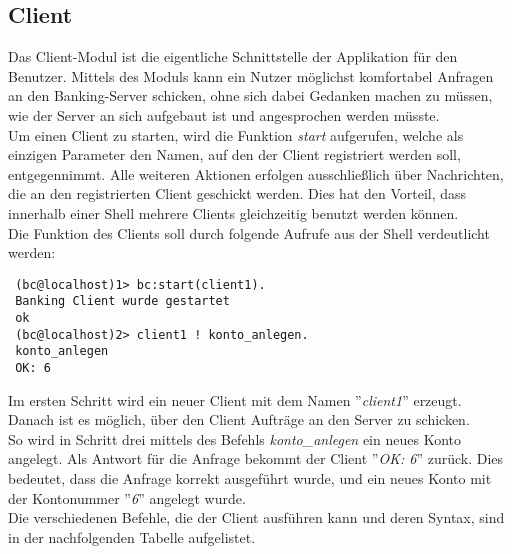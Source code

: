 \subsection{Client}
Das Client-Modul ist die eigentliche Schnittstelle der Applikation für den Benutzer. Mittels des Moduls kann ein Nutzer möglichst komfortabel Anfragen an den Banking-Server schicken, ohne sich dabei Gedanken machen zu müssen, wie der Server an sich aufgebaut ist und angesprochen werden müsste.\\
Um einen Client zu starten, wird die Funktion \textit{start} aufgerufen, welche als einzigen Parameter den Namen, auf den der Client registriert werden soll, entgegennimmt. Alle weiteren Aktionen erfolgen ausschließlich über Nachrichten, die an den registrierten Client geschickt werden. Dies hat den Vorteil, dass innerhalb einer Shell mehrere Clients gleichzeitig benutzt werden können.\\
Die Funktion des Clients soll durch folgende Aufrufe aus der Shell verdeutlicht werden:
\begin{lstlisting} 
 (bc@localhost)1> bc:start(client1).
 Banking Client wurde gestartet
 ok
 (bc@localhost)2> client1 ! konto_anlegen.
 konto_anlegen
 OK: 6
\end{lstlisting}
Im ersten Schritt wird ein neuer Client mit dem Namen ''\textit{client1}'' erzeugt. Danach ist es möglich, über den Client Aufträge an den Server zu schicken.\\ 
So wird in Schritt drei mittels des Befehls \textit{konto\_anlegen} ein neues Konto angelegt. Als Antwort für die Anfrage bekommt der Client ''\textit{OK: 6}'' zurück. Dies bedeutet, dass die Anfrage korrekt ausgeführt wurde, und ein neues Konto mit der Kontonummer ''\textit{6}'' angelegt wurde.\\
Die verschiedenen Befehle, die der Client ausführen kann und deren Syntax, sind in der nachfolgenden Tabelle aufgelistet.\\
